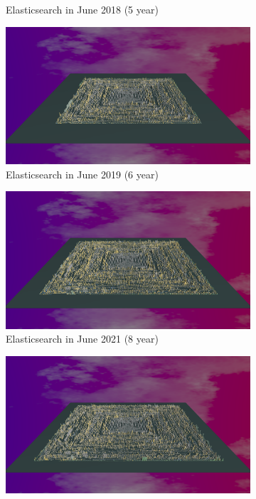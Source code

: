 \begin{figure}[h!]
\begin{subfigure}{0.48\textwidth}
        \caption{Elasticsearch in June 2018 (5 year)} 
        \label{fig:Elastic_V5_S3}
    \end{subfigure}\hspace*{\fill}
    \begin{subfigure}{0.48\textwidth}
        \includegraphics[width=\linewidth]{Elasticsearch/Animation006.png}
        \caption{Elasticsearch in June 2019  (6 year)} 
        \label{fig:Elastic_V5_S4}
    \end{subfigure}
    \medskip
    \begin{subfigure}{0.48\textwidth}
        \includegraphics[width=\linewidth]{Elasticsearch/Animation008.png}
        \caption{Elasticsearch in June 2021 (8 year)} 
        \label{fig:Elastic_V5_S5}
    \end{subfigure}\hspace*{\fill}
    \begin{subfigure}{0.48\textwidth}
        \includegraphics[width=\linewidth]{Elasticsearch/Animation009.png}

\end{subfigure}
\end{figure}
